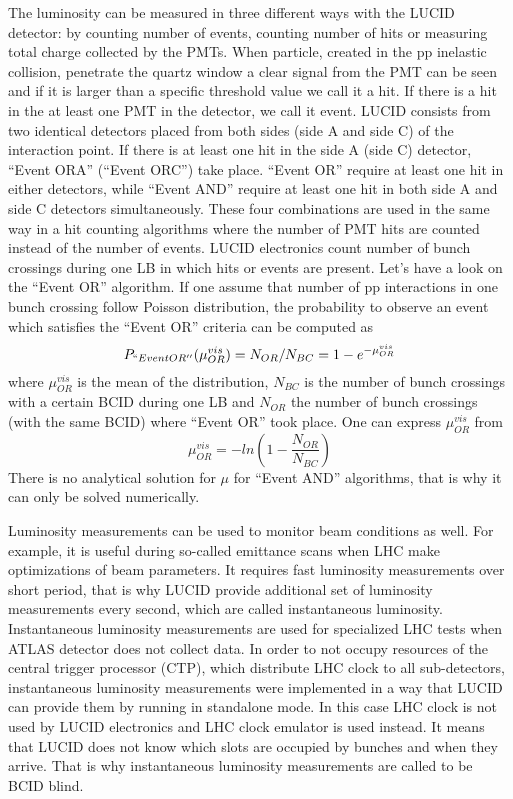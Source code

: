 The luminosity can be measured in three different ways with the LUCID detector: by counting number of events, counting number of hits or measuring total charge collected by the PMTs. When particle, created in the pp inelastic collision, penetrate the quartz window a clear signal from the PMT can be seen and if it is larger than a specific threshold value we call it a hit. If there is a hit in the at least one PMT in the detector, we call it event. LUCID consists from two identical detectors placed from both sides (side A and side C) of the interaction point. 
If there is at least one hit in the side A (side C) detector, ``Event ORA'' (``Event ORC'') take place. ``Event OR'' require at least one hit in either detectors, while ``Event AND'' require at least one hit in both side A and side C detectors simultaneously. These four combinations are used in the same way in a hit counting algorithms where the number of PMT hits are counted instead of the number of events.
LUCID electronics count number of bunch crossings during one LB in which hits or events are present.
Let’s have a look on the ``Event OR'' algorithm. If one assume that number of pp interactions in one bunch crossing follow Poisson distribution, the probability to observe an event which satisfies the ``Event OR'' criteria can be computed as
\begin{equation}
P_{``Event OR''} (\mu_{OR}^{vis}) = N_{OR} / N_{BC} = 1 - e^{-\mu_{OR}^{vis}}
\label{eq:poissonProb}
\end{equation}
where $\mu_{OR}^{vis}$ is the mean of the distribution, $N_{BC}$ is the number of bunch crossings with a certain BCID during one LB and $N_{OR}$ the number of bunch crossings 
(with the same BCID) where ``Event OR'' took place. One can express $\mu_{OR}^{vis}$ from 
\begin{equation}
\mu_{OR}^{vis} = -ln( 1 - \dfrac{N_{OR}}{N_{BC}})
\label{eq:logFormula}
\end{equation}
There is no analytical solution for $\mu$ for ``Event AND'' algorithms, that is why it can only be solved numerically. 

Luminosity measurements can be used to monitor beam conditions as well.
For example, it is useful during so-called emittance scans when LHC make optimizations of beam parameters.
It requires fast luminosity measurements over short period, that is why LUCID provide additional set of luminosity measurements every second, which are called instantaneous luminosity.
Instantaneous luminosity measurements are used for specialized LHC tests when ATLAS detector does not collect data. In order to not occupy resources of the central trigger processor (CTP), which distribute LHC clock to all sub-detectors, instantaneous luminosity measurements were implemented in a way that LUCID can provide them by running in standalone mode.
In this case LHC clock is not used by LUCID electronics and LHC clock emulator is used instead.
It means that LUCID does not know which slots are occupied by bunches and when they arrive.
That is why instantaneous luminosity measurements are called to be BCID blind.

